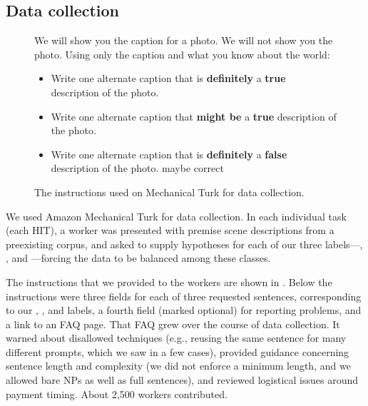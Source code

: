 
\subsection{Data collection}

\begin{figure}
\begin{framed}
\small
We will show you the caption for a photo. We will not show you the photo. Using only the caption and what you know about the world:
\begin{itemize}
\item Write one alternate caption that is \textbf{definitely} a \textbf{true} description of the photo. 
\item Write one alternate caption that \textbf{might be} a \textbf{true} description of the photo. 
\item Write one alternate caption that is \textbf{definitely} a \textbf{false} description of the photo.  maybe correct 
\end{itemize}
\end{framed}

\caption{\label{instructions-1}The instructions used on Mechanical Turk for data collection.}
\end{figure}

We used Amazon Mechanical Turk for data collection. In each individual task (each HIT), a worker was presented with premise scene descriptions from a preexisting corpus, and asked to supply hypotheses for each of our three labels---, , and ---forcing the data to be balanced among these classes.

The instructions that we provided to the workers are shown in . Below the instructions were three fields for each of three requested sentences, corresponding to our , , and  labels, a fourth field (marked optional) for reporting problems, and a link to an FAQ page. That FAQ grew over the course of data collection. It warned about disallowed techniques (e.g., reusing the same sentence for many different prompts, which we saw in a few cases), provided guidance concerning sentence length and complexity (we did not enforce a minimum length, and we allowed bare NPs as well as full sentences), and reviewed logistical issues around payment timing. About 2,500 workers contributed.


